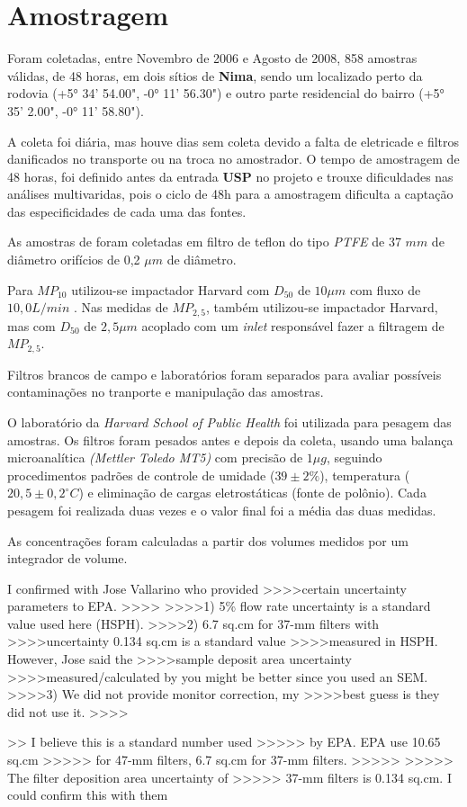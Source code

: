 \section{Amostragem}

Foram coletadas, entre Novembro de 2006 e Agosto de 2008, 858 amostras válidas, 
de 48 horas, em dois sítios de \textbf{Nima}, sendo um localizado perto da rodovia
(+5° 34' 54.00", -0° 11' 56.30") e outro parte residencial do 
bairro (+5° 35' 2.00", -0° 11' 58.80").

A coleta foi diária, mas houve dias sem coleta devido a falta de eletricade e
filtros danificados no transporte ou na troca no amostrador. 
O tempo de amostragem de 48 horas, foi definido antes da entrada \textbf{USP} 
no projeto e trouxe dificuldades nas análises multivaridas, pois o
ciclo de 48h para a amostragem dificulta a captação das especificidades 
de cada uma das fontes.

As amostras de foram coletadas em filtro de teflon do tipo 
\textit{PTFE} de 37 $mm$ de diâmetro orifícios de 0,2 $\mu m$ de diâmetro. 

Para $MP_{10}$ utilizou-se impactador Harvard com $D_{50}$ de $10 \mu m$ 
com fluxo de $10,0 L/min$ \cite{marple1987}. 
Nas medidas de $MP_{2,5}$, também utilizou-se impactador Harvard, 
mas com $D_{50}$ de $2,5 \mu m$ acoplado com um \textit{inlet} 
responsável fazer a filtragem de $MP_{2,5}$.

Filtros brancos de campo e laboratórios foram separados para avaliar 
possíveis contaminações no tranporte e manipulação das amostras. 

O laboratório da \textit{Harvard School of Public Health} foi
utilizada para pesagem das amostras.
Os filtros foram pesados antes e depois da coleta, usando uma balança 
microanalítica \textit{(Mettler Toledo MT5)} com precisão de $1 \mu g$, 
seguindo procedimentos padrões de controle de umidade ($39 \pm 2 \%$), 
temperatura ($20,5 \pm 0,2 ^{\circ} C$) e eliminação de cargas eletrostáticas 
(fonte de polônio).
Cada pesagem foi realizada duas vezes e o valor final foi a média das 
duas medidas.

As concentrações foram calculadas a partir dos volumes 
medidos por um integrador de volume.


I confirmed with Jose Vallarino who provided
>>>>certain uncertainty parameters to EPA.
>>>>
>>>>1) 5\% flow rate uncertainty is a standard value used here (HSPH).
>>>>2) 6.7 sq.cm for 37-mm filters with
>>>>uncertainty 0.134 sq.cm is a standard value
>>>>measured in HSPH. However, Jose said the
>>>>sample deposit area uncertainty
>>>>measured/calculated by you might be better since you used an SEM.
>>>>3) We did not provide monitor correction, my
>>>>best guess is they did not use it.
>>>> 

>>  I believe this is a standard number used
>>>>> by EPA. EPA use 10.65 sq.cm
>>>>> for 47-mm filters, 6.7 sq.cm for 37-mm filters.
>>>>>
>>>>>  The filter deposition area uncertainty of
>>>>> 37-mm filters is 0.134 sq.cm. I could confirm this with them 




